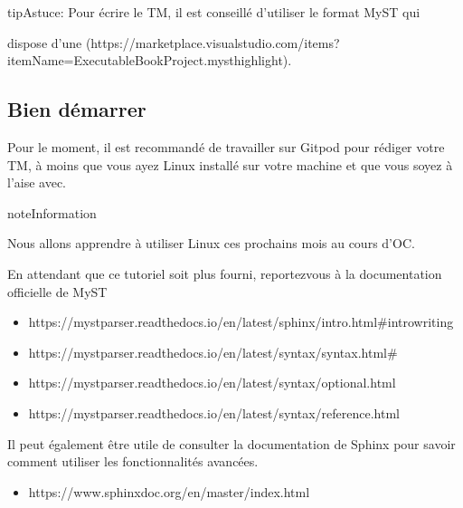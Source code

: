 \documentclass[a4,10pt,french]{sphinxmanual}
\begin{document}
\begin{sphinxadmonition}{tip}{Astuce:}
\sphinxAtStartPar
Pour écrire le TM, il est conseillé d’utiliser le format MyST qui

\sphinxAtStartPar
dispose d’une  (https://marketplace.visualstudio.com/items?itemName=ExecutableBookProject.myst\sphinxhyphen{}highlight).
\end{sphinxadmonition}


\subsection{Bien démarrer}
\label{\detokenize{tutoriel-sphinx/bases:bien-demarrer}}
\sphinxAtStartPar
Pour le moment, il est recommandé de travailler sur Gitpod pour rédiger votre
TM, à moins que vous ayez Linux installé sur votre machine et que vous soyez à
l’aise avec.

\begin{sphinxadmonition}{note}{Information}

\sphinxAtStartPar
Nous allons apprendre à utiliser Linux ces prochains mois au cours d’OC.
\end{sphinxadmonition}

\sphinxAtStartPar
En attendant que ce tutoriel soit plus fourni, reportez\sphinxhyphen{}vous à la documentation
officielle de MyST
\begin{itemize}
\item {} 
\sphinxAtStartPar
https://myst\sphinxhyphen{}parser.readthedocs.io/en/latest/sphinx/intro.html\#intro\sphinxhyphen{}writing

\item {} 
\sphinxAtStartPar
https://myst\sphinxhyphen{}parser.readthedocs.io/en/latest/syntax/syntax.html\#

\item {} 
\sphinxAtStartPar
https://myst\sphinxhyphen{}parser.readthedocs.io/en/latest/syntax/optional.html

\item {} 
\sphinxAtStartPar
https://myst\sphinxhyphen{}parser.readthedocs.io/en/latest/syntax/reference.html

\end{itemize}

\sphinxAtStartPar
Il peut également être utile de consulter la documentation de Sphinx pour savoir
comment utiliser les fonctionnalités avancées.
\begin{itemize}
\item {} 
\sphinxAtStartPar
https://www.sphinx\sphinxhyphen{}doc.org/en/master/index.html

\end{itemize}
\end{document}
